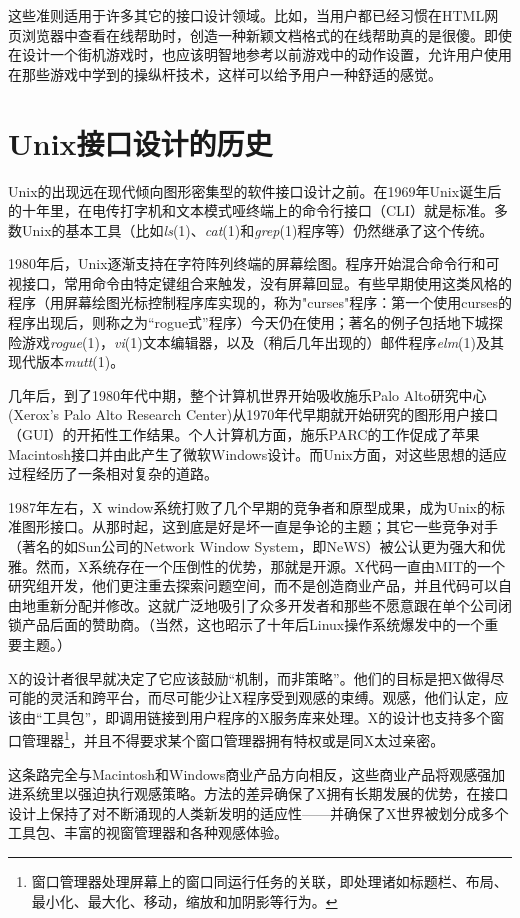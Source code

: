 \documentclass[12pt,oneside]{book}
\begin{document}
这些准则适用于许多其它的接口设计领域。比如，当用户都已经习惯在HTML网页浏览器中查看在线帮助时，创造一种新颖文档格式的在线帮助真的是很傻。即使在设计一个街机游戏时，也应该明智地参考以前游戏中的动作设置，允许用户使用在那些游戏中学到的操纵杆技术，这样可以给予用户一种舒适的感觉。


\section{Unix接口设计的历史}
Unix的出现远在现代倾向图形密集型的软件接口设计之前。在1969年Unix诞生后的十年里，在电传打字机和文本模式哑终端上的命令行接口（CLI）就是标准。多数Unix的基本工具（比如\textit{ls}(1)、\textit{cat}(1)和\textit{grep}(1)程序等）仍然继承了这个传统。

1980年后，Unix逐渐支持在字符阵列终端的屏幕绘图。程序开始混合命令行和可视接口，常用命令由特定键组合来触发，没有屏幕回显。有些早期使用这类风格的程序（用屏幕绘图光标控制程序库实现的，称为"curses"程序：第一个使用curses的程序出现后，则称之为“rogue式”程序）今天仍在使用；著名的例子包括地下城探险游戏\textit{rogue}(1)，\textit{vi}(1)文本编辑器，以及（稍后几年出现的）邮件程序\textit{elm}(1)及其现代版本\textit{mutt}(1)。

几年后，到了1980年代中期，整个计算机世界开始吸收施乐Palo Alto研究中心(Xerox's Palo Alto Research Center)从1970年代早期就开始研究的图形用户接口（GUI）的开拓性工作结果。个人计算机方面，施乐PARC的工作促成了苹果Macintosh接口并由此产生了微软Windows设计。而Unix方面，对这些思想的适应过程经历了一条相对复杂的道路。

1987年左右，X window系统打败了几个早期的竞争者和原型成果，成为Unix的标准图形接口。从那时起，这到底是好是坏一直是争论的主题；其它一些竞争对手（著名的如Sun公司的Network Window System，即NeWS）被公认更为强大和优雅。然而，X系统存在一个压倒性的优势，那就是开源。X代码一直由MIT的一个研究组开发，他们更注重去探索问题空间，而不是创造商业产品，并且代码可以自由地重新分配并修改。这就广泛地吸引了众多开发者和那些不愿意跟在单个公司闭锁产品后面的赞助商。（当然，这也昭示了十年后Linux操作系统爆发中的一个重要主题。）

X的设计者很早就决定了它应该鼓励“机制，而非策略”。他们的目标是把X做得尽可能的灵活和跨平台，而尽可能少让X程序受到观感的束缚。观感，他们认定，应该由“工具包”，即调用链接到用户程序的X服务库来处理。X的设计也支持多个窗口管理器\footnote{窗口管理器处理屏幕上的窗口同运行任务的关联，即处理诸如标题栏、布局、最小化、最大化、移动，缩放和加阴影等行为。}，并且不得要求某个窗口管理器拥有特权或是同X太过亲密。

这条路完全与Macintosh和Windows商业产品方向相反，这些商业产品将观感强加进系统里以强迫执行观感策略。方法的差异确保了X拥有长期发展的优势，在接口设计上保持了对不断涌现的人类新发明的适应性——并确保了X世界被划分成多个工具包、丰富的视窗管理器和各种观感体验。
\end{document}
